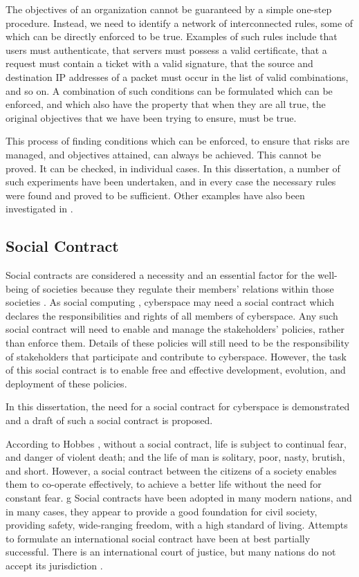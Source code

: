 The objectives of an organization cannot be guaranteed by a simple
one-step procedure. Instead, we need to identify a network of
interconnected rules, some of which can be directly enforced to be
true. Examples of such rules include that users must authenticate, that
servers must possess a valid certificate, that a request must contain
a ticket with a valid signature, that the source and destination IP
addresses of a packet must occur in the list of valid combinations, and
so on. A combination of such conditions can be formulated which can be
enforced, and which also have the property that when they are all true,
the original objectives that we have been trying to ensure, must be true.

This process of finding conditions which can be enforced, to ensure
that risks are managed, and objectives attained, can always be
achieved. This cannot be proved. It can be checked, in individual
cases. In this dissertation,  a number of such experiments have been
undertaken, and in every case the necessary rules were found and
proved to be sufficient. Other examples have also been investigated in
 \cite{Hadaad15,sheniar2018experiments,sheniar2019Graph}.

 
\subsection{Social Contract}
Social contracts are considered a necessity and an essential factor for the well-being of societies because they regulate their members' relations within those societies \cite{Leviathan}. As social computing \cite{parameswaran2007social}, cyberspace may need a social contract which declares the responsibilities and rights of all members of cyberspace. Any such social contract will need to enable and manage the stakeholders' policies, rather than enforce them. Details of these policies will still need to be the responsibility of stakeholders that participate and contribute to cyberspace. However, the task of this social contract is to enable free and effective development, evolution, and deployment of these policies. 

In this dissertation, the need for a social contract for cyberspace is demonstrated and a draft of such a social contract is proposed. 

\if 
According to Hobbes \cite{Leviathan}, without a social contract, life is subject to continual fear, and danger of violent death; and the life of man is solitary, poor, nasty, brutish, and short. 
However, a social contract between the citizens of a society enables them to co-operate effectively, to achieve a better life without the need for constant fear.
g
Social contracts have been adopted in many modern nations, and in many cases, they appear to provide a good foundation for civil society, providing safety, wide-ranging freedom, with a high standard of living. Attempts to formulate an international social contract have been at best partially successful. There is an international court of justice, but many nations do not accept its jurisdiction \cite{Robertson}.

